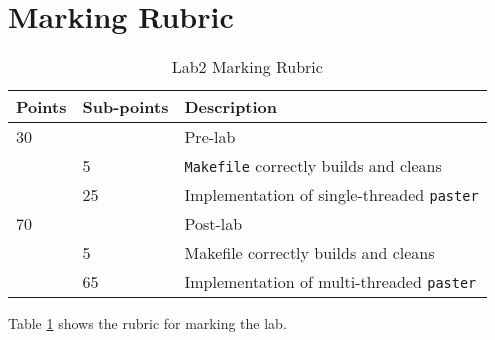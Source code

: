 \section{Marking Rubric}
\begin{table}[ht]
\begin{center}
\begin{tabular}{|p{2cm}|p{2cm}|p{9cm}|}
\hline
Points & Sub-points &Description  \\ \hline
30     &    & Pre-lab      \\ \hline
       & 5  & \verb+Makefile+ correctly builds and cleans \\ \hline
       & 25 & Implementation of single-threaded \verb+paster+ \\ \hline
70     &       & Post-lab \\ \hline
       & 5     & Makefile correctly builds and cleans \\ \hline
       & 65    & Implementation of multi-threaded \verb+paster+ \\ \hline
\end{tabular}
\caption{Lab2 Marking Rubric}
\label{tb_lab2_rubric}
\end{center}
\end{table}

Table \ref{tb_lab2_rubric} shows the rubric for marking the lab.


